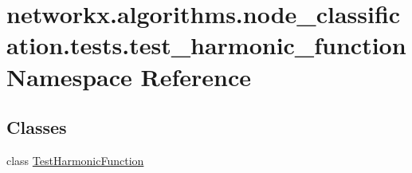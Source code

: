\hypertarget{namespacenetworkx_1_1algorithms_1_1node__classification_1_1tests_1_1test__harmonic__function}{}\section{networkx.\+algorithms.\+node\+\_\+classification.\+tests.\+test\+\_\+harmonic\+\_\+function Namespace Reference}
\label{namespacenetworkx_1_1algorithms_1_1node__classification_1_1tests_1_1test__harmonic__function}
\subsection*{Classes}
\begin{DoxyCompactItemize}
\item 
class \hyperlink{classnetworkx_1_1algorithms_1_1node__classification_1_1tests_1_1test__harmonic__function_1_1TestHarmonicFunction}{Test\+Harmonic\+Function}
\end{DoxyCompactItemize}
